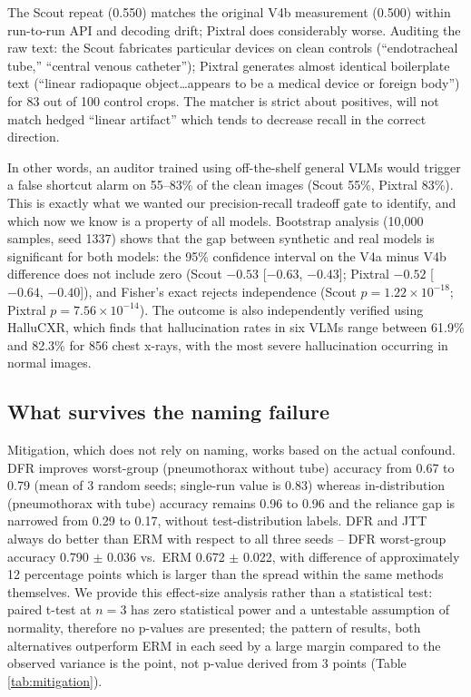 \documentclass{ieeeaccess}
\begin{document}
The Scout
repeat (0.550) matches the original V4b measurement (0.500) within
run-to-run API and decoding drift; Pixtral does considerably worse. Auditing
the raw text: the Scout fabricates particular devices on clean controls
(``endotracheal tube,'' ``central venous catheter''); Pixtral generates almost
identical boilerplate text (``linear radiopaque object\ldots appears to be a
medical device or foreign body'') for 83 out of 100 control crops.
The matcher is strict about positives,  will not match hedged
``linear artifact''  which tends to decrease recall in the correct
direction.

In other words, an auditor trained using off-the-shelf general VLMs would trigger
a false shortcut alarm on 55--83\% of the clean images (Scout 55\%, Pixtral
83\%). This is exactly what we wanted our precision-recall tradeoff gate
to identify, and which now we know is a property of all models. Bootstrap analysis (10,000 samples, seed 1337) shows that the gap between synthetic and real
models is significant for both models: the 95\% confidence interval on the
V4a minus V4b difference does not include zero (Scout $-0.53$ [$-0.63$, $-0.43$];
Pixtral $-0.52$ [$-0.64$, $-0.40$]), and
Fisher's exact rejects independence (Scout $p = 1.22\times10^{-18}$; Pixtral
$p = 7.56\times10^{-14}$).  The outcome is also independently verified using
HalluCXR, which finds that hallucination rates in six VLMs range between 61.9\%
and 82.3\% for 856 chest x-rays, with the most severe hallucination occurring
in normal images.

\subsection{What survives the naming failure}
\label{sec:results-5.3}
Mitigation, which does not rely on naming, works based on the actual confound. DFR
improves worst-group (pneumothorax without tube) accuracy from 0.67 to 0.79
(mean of 3 random seeds; single-run value is 0.83) whereas in-distribution
(pneumothorax with tube) accuracy remains 0.96 to 0.96 and the reliance gap
is narrowed from 0.29 to 0.17, without test-distribution labels. DFR and JTT
always do better than ERM with respect to all three seeds -- DFR worst-group
accuracy 0.790 $\pm$ 0.036 vs.\ ERM 0.672 $\pm$ 0.022, with difference of
approximately 12 percentage points which is larger than the spread within the
same methods themselves. We provide this effect-size analysis rather than a
statistical test: paired t-test at $n=3$ has zero statistical power and a
untestable assumption of normality, therefore no p-values are presented;
the pattern of results, both alternatives outperform ERM in each seed
by a large margin compared to the observed variance is the point,
not p-value derived from 3 points (Table \ref{tab:mitigation}).
\end{document}
